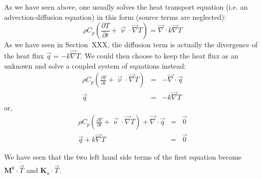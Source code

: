 
As we have seen above, one usually solves the heat transport equation (i.e. 
an advection-diffusion equation) in this form (source terms are neglected):
\begin{equation}
\rho C_p \left( \frac{\partial T}{\partial t} + {\vec \upnu}\cdot {\vec\nabla T} \right)
= {\vec \nabla} \cdot k \vec\nabla T 
\end{equation}
As we have seen in Section~{XXX}, the diffusion term is actually the divergence of the heat flux
$\vec{q}=-k \vec \nabla T$. We could then choose to keep the heat flux as an unknown and 
solve a coupled system of equations instead:
\begin{eqnarray}
\rho C_p \left( \frac{\partial T}{\partial t} + {\vec \upnu}\cdot {\vec\nabla T} \right)
&=& - {\vec \nabla} \cdot \vec{q} \\ 
\vec{q} &=& - k \vec \nabla T
\end{eqnarray}
or, 
\begin{eqnarray}
\rho C_p \left( \frac{\partial T}{\partial t} + {\vec \upnu}\cdot {\vec\nabla T} \right)
+ {\vec \nabla} \cdot \vec{q} &=& \vec{0} \label{eq:htediff1}\\ 
\vec{q} + k \vec \nabla T &=& \vec{0} \label{eq:htediff2}
\end{eqnarray}

We have seen that the two left hand side terms of the first equation become 
${\bm M}^\uptheta \cdot \dot{\vec{T}}$ and ${\bm K}_a \cdot \vec{T}$.


